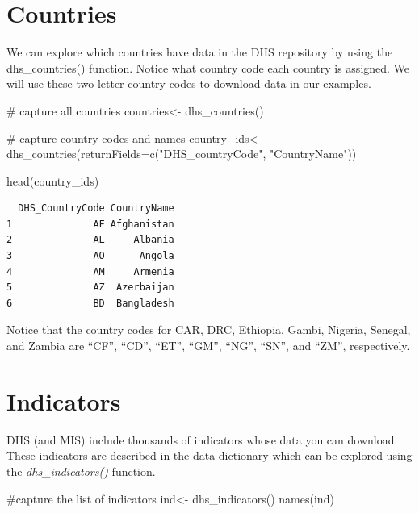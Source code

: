 \documentclass[
  letterpaper,
  DIV=11,
  numbers=noendperiod]{scrreprt}
\newenvironment{Shaded}{\begin{snugshade}}{\end{snugshade}}
\newcommand{\AttributeTok}[1]{\textcolor[rgb]{0.40,0.45,0.13}{#1}}
\newcommand{\CommentTok}[1]{\textcolor[rgb]{0.37,0.37,0.37}{#1}}
\newcommand{\FunctionTok}[1]{\textcolor[rgb]{0.28,0.35,0.67}{#1}}
\newcommand{\NormalTok}[1]{\textcolor[rgb]{0.00,0.23,0.31}{#1}}
\newcommand{\OtherTok}[1]{\textcolor[rgb]{0.00,0.23,0.31}{#1}}
\newcommand{\StringTok}[1]{\textcolor[rgb]{0.13,0.47,0.30}{#1}}
\begin{document}
\section{Countries}\label{countries}

We can explore which countries have data in the DHS repository by using
the dhs\_countries() function. Notice what country code each country is
assigned. We will use these two-letter country codes to download data in
our examples.

\begin{Shaded}
\begin{Highlighting}[]
\CommentTok{\# capture all countries}
\NormalTok{countries}\OtherTok{\textless{}{-}} \FunctionTok{dhs\_countries}\NormalTok{()}

\CommentTok{\# capture country codes and names}
\NormalTok{country\_ids}\OtherTok{\textless{}{-}} \FunctionTok{dhs\_countries}\NormalTok{(}\AttributeTok{returnFields=}\FunctionTok{c}\NormalTok{(}\StringTok{"DHS\_countryCode"}\NormalTok{, }\StringTok{"CountryName"}\NormalTok{))}

\FunctionTok{head}\NormalTok{(country\_ids)}
\end{Highlighting}
\end{Shaded}

\begin{verbatim}
  DHS_CountryCode CountryName
1              AF Afghanistan
2              AL     Albania
3              AO      Angola
4              AM     Armenia
5              AZ  Azerbaijan
6              BD  Bangladesh
\end{verbatim}

Notice that the country codes for CAR, DRC, Ethiopia, Gambi, Nigeria,
Senegal, and Zambia are ``CF'', ``CD'', ``ET'', ``GM'', ``NG'', ``SN'',
and ``ZM'', respectively.

\section{Indicators}\label{indicators}

DHS (and MIS) include thousands of indicators whose data you can
download These indicators are described in the data dictionary which can
be explored using the \emph{dhs\_indicators()} function.

\begin{Shaded}
\begin{Highlighting}[]
\CommentTok{\#capture the list of indicators}
\NormalTok{ind}\OtherTok{\textless{}{-}} \FunctionTok{dhs\_indicators}\NormalTok{()}
\FunctionTok{names}\NormalTok{(ind)}
\end{Highlighting}
\end{Shaded}
\end{document}
